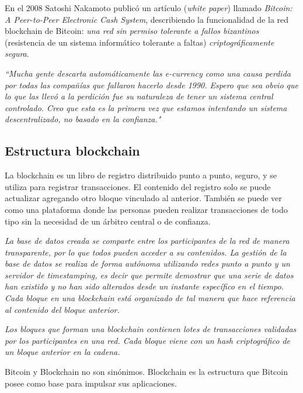 En el 2008 Satoshi Nakamoto publicó un artículo (\textit{white paper}) llamado \textit{Bitcoin: A Peer-to-Peer Electronic Cash System}, describiendo la funcionalidad de la red blockchain de Bitcoin: \textit{una red sin permiso tolerante a fallos bizantinos} (resistencia de un sistema informático tolerante a faltas) \textit{criptográficamente segura}.

\begin{displayquote}
    \textit{``Mucha gente descarta automáticamente las e-currency como una causa perdida por todas las compañías que fallaron hacerlo desde 1990. Espero que sea obvio que lo que las llevó a la perdición fue su naturaleza de tener un sistema central controlado. Creo que esta es la primera vez que estamos intentando un sistema descentralizado, no basado en la confianza."}
\end{displayquote}

\subsection{Estructura blockchain}
La blockchain es un libro de registro distribuido punto a punto, seguro, y se utiliza para registrar transacciones. El contenido del registro solo se puede actualizar agregando otro bloque vinculado al anterior. También se puede ver como una plataforma donde las personas pueden realizar transacciones de todo tipo sin la necesidad de un árbitro central o de confianza.

\textit{La base de datos creada se comparte entre los participantes de la red de manera transparente, por lo que todos pueden acceder a su contenidos. La gestión de la base de datos se realiza de forma autónoma utilizando redes punto a punto y un servidor de timestamping, es decir que permite demostrar que una serie de datos han existido y no han sido alterados desde un instante específico en el tiempo. Cada bloque en una blockchain está organizado de tal manera que hace referencia al contenido del bloque anterior.}\cite{101blockchains}

\textit{Los bloques que forman una blockchain contienen lotes de transacciones validadas por los participantes en una red. Cada bloque viene con un hash criptográfico de un bloque anterior en la cadena.}\cite{101blockchains}

\begin{notesBox}
    Bitcoin y Blockchain no son sinónimos. Blockchain es la estructura que Bitcoin posee como base para impulsar sus aplicaciones.
\end{notesBox}



